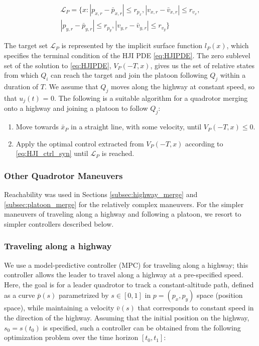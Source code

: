 \begin{equation}
\begin{aligned}
\mathcal{L}_P = \{x: |p_{x,r}-\bar{p}_{x,r}|\le r_{p_x}, |v_{x,r}-\bar{v}_{x,r}|\le r_{v_x}, \\
|p_{y,r} - \bar{p}_{y,r}| \le r_{p_y}, |v_{y,r} - \bar{v}_{y,r}|\le r_{v_y} \}
\end{aligned}
\end{equation}

The target set $\mathcal{L}_P$ is represented by the implicit surface function $l_P(x)$, which specifies the terminal condition of the HJI PDE \eqref{eq:HJIPDE}. The zero sublevel set of the solution to \eqref{eq:HJIPDE}, $V_P(-T,x)$, gives us the set of relative states from which $Q_i$ can reach the target and join the platoon following $Q_j$ within a duration of $T$. We assume that $Q_j$ moves along the highway at constant speed, so that $u_j(t)$ = 0. The following is a suitable algorithm for a quadrotor merging onto a highway and joining a platoon to follow $Q_j$:

\begin{enumerate}
\item Move towards $\bar{x}_P$ in a straight line, with some velocity, until $V_P(-T,x)\le 0$.
\item Apply the optimal control extracted from $V_P(-T,x)$ according to \eqref{eq:HJI_ctrl_syn} until $\mathcal{L}_P$ is reached.
\end{enumerate}

\subsubsection{Other Quadrotor Maneuvers}
Reachability was used in Sections \ref{subsec:highway_merge} and \ref{subsec:platoon_merge} for the relatively complex maneuvers. For the simpler maneuvers of traveling along a highway and following a platoon, we resort to simpler controllers described below.

\subsubsection{Traveling along a highway} \label{sec:travel_hwy}
We use a model-predictive controller (MPC) for traveling along a highway; this controller allows the leader to travel along a highway at a pre-specified speed. Here, the goal is for a leader quadrotor to track a constant-altitude path, defined as a curve $\bar{p}(s)$ parametrized by $s\in[0,1]$ in $p=(p_x, p_y)$ space (position space), while maintaining a velocity $\bar{v}(s)$ that corresponds to constant speed in the direction of the highway. Assuming that the initial position on the highway, $s_0=s(t_0)$ is specified, such a controller can be obtained from the following optimization problem over the time horizon $[t_0, t_1]$:

